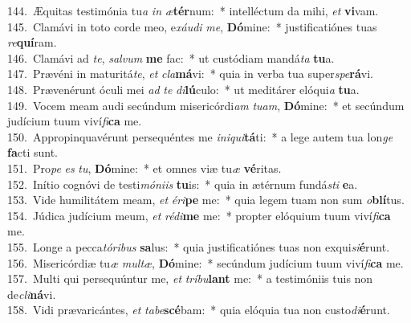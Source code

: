 {144.~}Æquitas testimónia tu\textit{a} \textit{in} \textit{æ}\textbf{tér}num:~* intelléctum da mihi, \textit{et} \textbf{vi}vam.\\
{145.~}Clamávi in toto corde meo, e\textit{xáu}\textit{di} \textit{me}, \textbf{Dó}mine:~* justificatiónes tuas \textit{re}\textbf{quí}ram.\\
{146.~}Clamávi ad \textit{te}, \textit{sal}\textit{vum} \textbf{me} fac:~* ut custódiam mandá\textit{ta} \textbf{tu}a.\\
{147.~}Prævéni in maturitá\textit{te}, \textit{et} \textit{cla}\textbf{má}vi:~* quia in verba tua super\textit{spe}\textbf{rá}vi.\\
{148.~}Prævenérunt óculi mei \textit{ad} \textit{te} \textit{di}\textbf{lú}culo:~* ut meditárer elóqui\textit{a} \textbf{tu}a.\\
{149.~}Vocem meam audi secúndum misericórdi\textit{am} \textit{tu}\textit{am}, \textbf{Dó}mine:~* et secúndum judícium tuum viví\textit{fi}\textbf{ca} me.\\
{150.~}Appropinquavérunt persequéntes me \textit{i}\textit{ni}\textit{qui}\textbf{tá}ti:~* a lege autem tua lon\textit{ge} \textbf{fa}cti sunt.\\
{151.~}Pro\textit{pe} \textit{es} \textit{tu}, \textbf{Dó}mine:~* et omnes viæ tu\textit{æ} \textbf{vé}ritas.\\
{152.~}Inítio cognóvi de testi\textit{mó}\textit{ni}\textit{is} \textbf{tu}is:~* quia in ætérnum fundá\textit{sti} \textbf{e}a.\\
{153.~}Vide humilitátem meam, \textit{et} \textit{é}\textit{ri}\textbf{pe} me:~* quia legem tuam non sum \textit{o}\textbf{blí}tus.\\
{154.~}Júdica judícium meum, \textit{et} \textit{ré}\textit{di}\textbf{me} me:~* propter elóquium tuum viví\textit{fi}\textbf{ca} me.\\
{155.~}Longe a pecca\textit{tó}\textit{ri}\textit{bus} \textbf{sa}lus:~* quia justificatiónes tuas non exqui\textit{si}\textbf{é}runt.\\
{156.~}Misericórdiæ tu\textit{æ} \textit{mul}\textit{tæ}, \textbf{Dó}mine:~* secúndum judícium tuum viví\textit{fi}\textbf{ca} me.\\
{157.~}Multi qui persequúntur me, \textit{et} \textit{trí}\textit{bu}\textbf{lant} me:~* a testimóniis tuis non de\textit{cli}\textbf{ná}vi.\\
{158.~}Vidi prævaricántes, \textit{et} \textit{ta}\textit{be}\textbf{scé}bam:~* quia elóquia tua non custo\textit{di}\textbf{é}runt.\\
